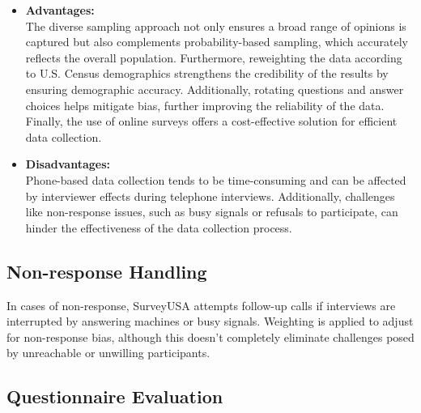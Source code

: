 \documentclass[
  letterpaper,
  DIV=11,
  numbers=noendperiod]{scrartcl}
\providecommand{\tightlist}{%
  \setlength{\itemsep}{0pt}\setlength{\parskip}{0pt}}\usepackage{longtable,booktabs,array}
\begin{document}
\begin{itemize}
\tightlist
\item
  \textbf{Advantages:}\\
  The diverse sampling approach not only ensures a broad range of
  opinions is captured but also complements probability-based sampling,
  which accurately reflects the overall population. Furthermore,
  reweighting the data according to U.S. Census demographics strengthens
  the credibility of the results by ensuring demographic accuracy.
  Additionally, rotating questions and answer choices helps mitigate
  bias, further improving the reliability of the data. Finally, the use
  of online surveys offers a cost-effective solution for efficient data
  collection.\\
\item
  \textbf{Disadvantages:}\\
  Phone-based data collection tends to be time-consuming and can be
  affected by interviewer effects during telephone interviews.
  Additionally, challenges like non-response issues, such as busy
  signals or refusals to participate, can hinder the effectiveness of
  the data collection process.\\
\end{itemize}

\subsection{\texorpdfstring{Non-response Handling\\
}{Non-response Handling }}\label{non-response-handling}

In cases of non-response, SurveyUSA attempts follow-up calls if
interviews are interrupted by answering machines or busy signals.
Weighting is applied to adjust for non-response bias, although this
doesn't completely eliminate challenges posed by unreachable or
unwilling participants.\\

\subsection{\texorpdfstring{Questionnaire Evaluation\\
}{Questionnaire Evaluation }}\label{questionnaire-evaluation}
\end{document}
